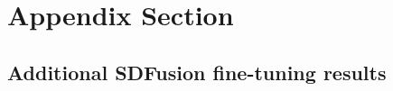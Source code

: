 \section{Appendix Section}
\label{sec:appendix_section}

\subsection{Additional SDFusion fine-tuning results}
\label{sec:appendic_fine_tuning}

